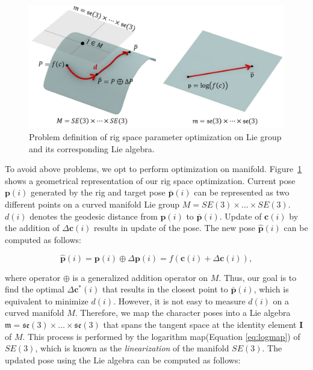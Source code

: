 \begin{figure}[ht]
  \centering
  \includegraphics[width=1.0\linewidth]{images/se3}
  \caption{Problem definition of rig space parameter optimization on \SE{} Lie group and its corresponding \se{} Lie algebra.}
  \label{fig:se3}
\end{figure}
To avoid above problems, we opt to perform optimization on manifold.
Figure~\ref{fig:se3} shows a geometrical representation of our rig space optimization. Current pose $\mathbf{p}(i)$ generated by the rig and target pose $\bar{\mathbf{p}}(i)$ can be represented as two different points on a curved manifold Lie group $M = SE(3)\times ... \times SE(3)$.
$d(i)$ denotes the geodesic distance from $\mathbf{p}(i)$ to $\bar{\mathbf{p}}(i)$.
Update of $\mathbf{c}(i)$ by the addition of $\Delta{}\mathbf{c}(i)$ results in update of the pose.
The new pose $\hat{\mathbf{p}}(i)$ can be computed as follows:

\begin{equation}
	\hat{\mathbf{p}}(i) = \mathbf{p}(i)\oplus\Delta \mathbf{p}(i) = f(\mathbf{c}(i)+\Delta{}\mathbf{c}(i)),
\end{equation}


where operator $\oplus$ is a generalized addition operator on $M$. Thus, our goal is to find the optimal $\Delta{}\mathbf{c}^*(i)$ that results in the closest point to $\bar{\mathbf{p}}(i)$, which is equivalent to minimize $d(i)$.
However, it is not easy to measure $d(i)$ on a curved manifold $M$.
Therefore, we map the character poses into a Lie algebra $\mathfrak{m} = \mathfrak{se}(3)\times \ldots \times \mathfrak{se}(3)$ that spans the tangent space at the identity element $\mathbf{I}$ of $M$.
This process is performed by the logarithm map(Equation \ref{eq:logmap}) of $SE(3)$, which is known as the \textit{linearization} of the manifold $SE(3)$.
The updated pose using the Lie algebra can be computed as follows:

